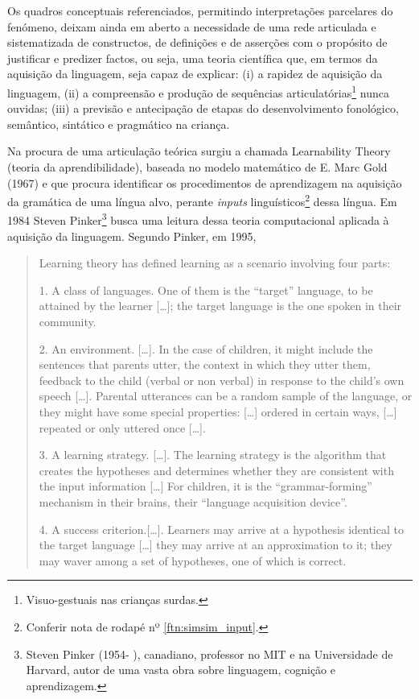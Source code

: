 \documentclass[output=paper]{LSP/langsci}
\begin{document}
Os quadros conceptuais referenciados, permitindo interpretações parcelares do fenómeno, deixam ainda em aberto a necessidade de uma rede articulada e sistematizada de constructos, de definições e de asserções com o propósito de justificar e predizer factos, ou seja, uma teoria científica \citep{kerlinger1973} que, em termos da aquisição da linguagem, seja capaz de explicar: (i) a rapidez de aquisição da linguagem, (ii) a compreensão e produção de sequências articulatórias\footnote{Visuo-gestuais nas crianças surdas.} nunca ouvidas; (iii) a previsão e antecipação de etapas do desenvolvimento fonológico, semântico, sintático e pragmático na criança.

Na procura de uma articulação teórica surgiu a chamada Learnability Theory (teoria da aprendibilidade), baseada no modelo matemático de E. Marc Gold (1967) e que procura identificar os procedimentos de aprendizagem na aquisição da gramática de uma língua alvo, perante \textit{inputs} linguísticos\footnote{Conferir nota de rodapé nº \ref{ftn:simsim_input}.} dessa língua. Em 1984 Steven Pinker\footnote{Steven Pinker (1954-  ), canadiano, professor no MIT e na Universidade de Harvard, autor de uma vasta obra sobre linguagem, cognição e aprendizagem.} busca uma leitura dessa teoria computacional aplicada à aquisição da linguagem. Segundo Pinker, em 1995,

\begin{quote}
Learning theory has defined learning as a scenario involving four parts:

1. A class of languages. One of them is the “target” language, to be attained by the learner [\ldots]; the target language is the one spoken in their community.

 2. An environment. [\ldots]. In the case of children, it might include the sentences that parents utter, the context in which they utter them, feedback to the child (verbal or non verbal) in response to the child’s own speech [\ldots]. Parental utterances can be a random sample of the language, or they might have some special properties: [\ldots] ordered in certain ways, [\ldots] repeated or only uttered once [\ldots].
 
3. A learning strategy. [\ldots]. The learning strategy is the algorithm that creates the hypotheses and determines whether they are consistent with the input information [\ldots] For children, it is the “grammar-forming” mechanism in their brains, their “language acquisition device”.

4. A success criterion.[\ldots]. Learners may arrive at a hypothesis identical to the target language [\ldots] they may arrive at an approximation to it; they may waver among a set of hypotheses, one of which is correct. \citep[147]{pinker1995}
\end{quote}
\end{document}
